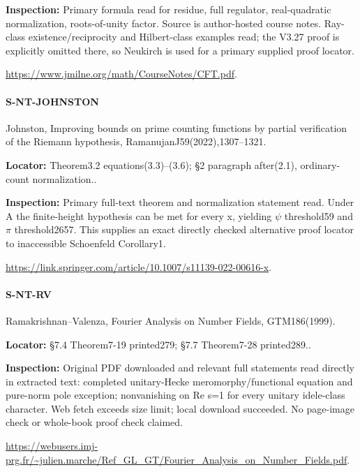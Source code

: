 \documentclass[11pt,a4paper]{article}
\begin{document}
\textbf{Inspection:} Primary formula read for residue, full regulator, real-quadratic normalization, roots-of-unity factor.\allowbreak{} Source is author-hosted course notes.\allowbreak{} Ray-class existence/\allowbreak{}reciprocity and Hilbert-class examples read; the V3.\allowbreak{}27 proof is explicitly omitted there, so Neukirch is used for a primary supplied proof locator.\allowbreak{}

\url{https://www.jmilne.org/math/CourseNotes/CFT.pdf}.

\paragraph{S-NT-JOHNSTON} Johnston, Improving bounds on prime counting functions by partial verification of the Riemann hypothesis, RamanujanJ59(2022),1307–\allowbreak{}1321.

\textbf{Locator:} Theorem3.\allowbreak{}2 equations(3.\allowbreak{}3)–\allowbreak{}(3.\allowbreak{}6); §2 paragraph after(2.\allowbreak{}1), ordinary-count normalization.\allowbreak{}.

\textbf{Inspection:} Primary full-text theorem and normalization statement read.\allowbreak{} Under A the finite-height hypothesis can be met for every x, yielding \ensuremath{\psi} threshold59 and \ensuremath{\pi} threshold2657.\allowbreak{} This supplies an exact directly checked alternative proof locator to inaccessible Schoenfeld Corollary1.\allowbreak{}

\url{https://link.springer.com/article/10.1007/s11139-022-00616-x}.

\paragraph{S-NT-RV} Ramakrishnan–\allowbreak{}Valenza, Fourier Analysis on Number Fields, GTM186(1999).

\textbf{Locator:} §7.\allowbreak{}4 Theorem7-19 printed279; §7.\allowbreak{}7 Theorem7-28 printed289.\allowbreak{}.

\textbf{Inspection:} Original PDF downloaded and relevant full statements read directly in extracted text:\allowbreak{} completed unitary-Hecke meromorphy/\allowbreak{}functional equation and pure-norm pole exception; nonvanishing on Re s=1 for every unitary idele-class character.\allowbreak{} Web fetch exceeds size limit; local download succeeded.\allowbreak{} No page-image check or whole-book proof check claimed.\allowbreak{}

\url{https://webusers.imj-prg.fr/~julien.marche/Ref_GL_GT/Fourier_Analysis_on_Number_Fields.pdf}.
\end{document}
